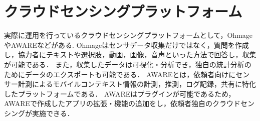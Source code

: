 \section{クラウドセンシングプラットフォーム}
\label{sec:format_abst}
実際に運用を行っているクラウドセンシングプラットフォームとして，Ohmage\cite{Tangmunarunkit}\cite{ohmage}やAWARE\cite{Ferreira}\cite{AWARE}などがある.
Ohmageはセンサデータ収集だけではなく，質問を作成し，協力者にテキストや選択肢，動画，画像，音声といった方法で回答し，収集が可能である．
また，収集したデータは可視化・分析でき，独自の統計分析のためにデータのエクスポートも可能である．
AWAREとは，依頼者向けにセンサー計測によるモバイルコンテキスト情報の計測，推測，ログ記録，共有に特化したプラットフォームである．
AWAREはプラグインが可能であるため，AWAREで作成したアプリの拡張・機能の追加をし，依頼者独自のクラウドセンシングが実施できる．

